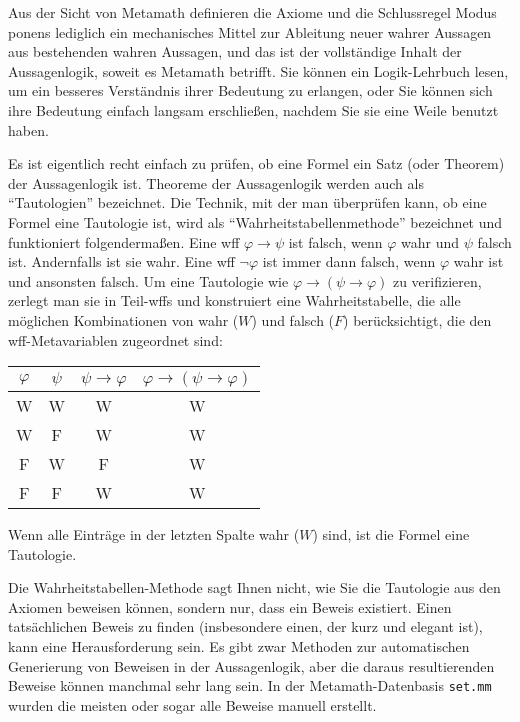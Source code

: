 Aus der Sicht von Metamath definieren die Axiome und die Schlussregel Modus ponens lediglich ein mechanisches Mittel zur Ableitung neuer wahrer Aussagen aus bestehenden wahren Aussagen, und das ist der vollständige Inhalt der Aussagenlogik, soweit es Metamath betrifft.  Sie können ein Logik-Lehrbuch lesen, um ein besseres Verständnis ihrer Bedeutung zu erlangen, oder Sie können sich ihre Bedeutung einfach langsam erschließen, nachdem Sie sie eine Weile benutzt haben.

Es ist eigentlich recht einfach zu prüfen, ob eine Formel ein Satz (oder Theorem) der Aussagenlogik ist.  Theoreme der Aussagenlogik werden auch als "`Tautologien"' bezeichnet.  Die Technik, mit der man überprüfen kann, ob eine Formel eine Tautologie ist, wird als "`Wahrheitstabellenmethode"' bezeichnet und funktioniert folgendermaßen.  Eine wff $\varphi\rightarrow\psi$ ist falsch, wenn $\varphi$ wahr und $\psi$ falsch ist.  Andernfalls ist sie wahr.  Eine wff $\lnot\varphi$ ist immer dann falsch, wenn $\varphi$ wahr ist und ansonsten falsch. Um eine Tautologie wie $\varphi\rightarrow(\psi\rightarrow \varphi)$ zu verifizieren, zerlegt man sie in Teil-wffs und konstruiert eine Wahrheitstabelle, die alle möglichen Kombinationen von wahr ($W$) und falsch ($F$) berücksichtigt, die den wff-Metavariablen zugeordnet sind:
\begin{center}\begin{tabular}{|c|c|c|c|}\hline
\mbox{$\varphi$} & \mbox{$\psi$} & \mbox{$\psi\rightarrow\varphi$}
    & \mbox{$\varphi\rightarrow(\psi\rightarrow \varphi)$} \\ \hline \hline
              W   &  W    &      W       &        W    \\ \hline
              W   &  F    &      W       &        W    \\ \hline
              F   &  W    &      F       &        W    \\ \hline
              F   &  F    &      W       &        W    \\ \hline
\end{tabular}\end{center}
Wenn alle Einträge in der letzten Spalte wahr ($W$) sind, ist die Formel eine Tautologie.

Die Wahrheitstabellen-Methode sagt Ihnen nicht, wie Sie die Tautologie aus den Axiomen beweisen können, sondern nur, dass ein Beweis existiert.  Einen tatsächlichen Beweis zu finden (insbesondere einen, der kurz und elegant ist), kann eine Herausforderung sein.  Es gibt zwar Methoden zur automatischen Generierung von Beweisen in der Aussagenlogik, aber die daraus resultierenden Beweise können manchmal sehr lang sein.  In der Metamath-Datenbasis \texttt{set.mm} wurden die meisten oder sogar alle Beweise manuell erstellt. 


